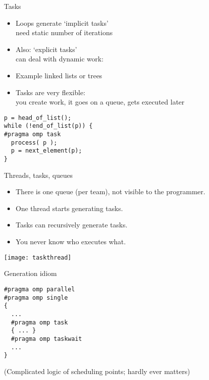 
\begin{numberedframe}{Tasks}
  \begin{itemize}
  \item Loops generate `implicit tasks'\\
    need static number of iterations
  \item Also: `explicit tasks' \\
    can deal with dynamic work:
  \item 
    Example linked lists or trees
  \item Tasks are very flexible:\\
    you create work, it goes on a queue, gets executed later
  \end{itemize}
\begin{lstlisting}
p = head_of_list();
while (!end_of_list(p)) {
#pragma omp task
  process( p );
  p = next_element(p);
}
\end{lstlisting}
\end{numberedframe}

\begin{numberedframe}{Threads, tasks, queues}
  \begin{itemize}
  \item There is one queue (per team), not visible to the programmer.
  \item One thread starts generating tasks.
  \item Tasks can recursively generate tasks.
  \item You never know who executes what.
  \end{itemize}
  \texttt{[image: taskthread]}
\end{numberedframe}

\begin{numberedframe}{Generation idiom}
\begin{lstlisting}
#pragma omp parallel
#pragma omp single
{
  ...
  #pragma omp task
  { ... }
  #pragma omp taskwait
  ...
}
\end{lstlisting}
(Complicated logic of scheduling points; hardly ever matters)
\end{numberedframe}

